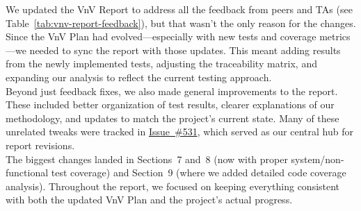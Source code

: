 \documentclass{article}
\begin{document}
We updated the VnV Report to address all the feedback from peers and TAs (see Table~\ref{tab:vnv-report-feedback}), but that wasn’t the only reason for the changes. Since the VnV Plan had evolved—especially with new tests and coverage metrics—we needed to sync the report with those updates. This meant adding results from the newly implemented tests, adjusting the traceability matrix, and expanding our analysis to reflect the current testing approach.\\ 

\noindent Beyond just feedback fixes, we also made general improvements to the report. These included better organization of test results, clearer explanations of our methodology, and updates to match the project’s current state. Many of these unrelated tweaks were tracked in \href{https://github.com/ssm-lab/capstone--source-code-optimizer/issues/531}{Issue~\#531}, which served as our central hub for report revisions.\\ 

\noindent The biggest changes landed in Sections~7 and~8 (now with proper system/non-functional test coverage) and Section~9 (where we added detailed code coverage analysis). Throughout the report, we focused on keeping everything consistent with both the updated VnV Plan and the project’s actual progress.
\end{document}
